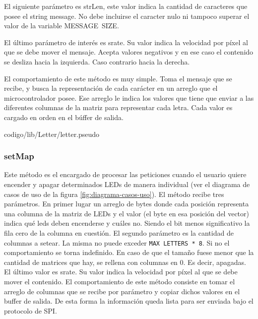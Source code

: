        El siguiente parámetro es strLen, este valor indica la cantidad de caracteres que posee el string message. No debe incluirse el caracter nulo ni tampoco superar el valor de la variable \mbox{MESSAGE SIZE}.

        El último parámetro de interés es srate. Su valor indica la velocidad por píxel al que se debe mover el mensaje. Acepta valores negativos y en ese caso el contenido se desliza hacia la izquierda. Caso contrario hacia la derecha.

        El comportamiento de este método es muy simple. Toma el mensaje que se recibe, y busca la representación de cada carácter en un arreglo que el microcontrolador posee. Ese arreglo le indica los valores que tiene que enviar a las diferentes columnas de la matriz para representar cada letra. Cada valor es cargado en orden en el búffer de salida.

        
                     {codigo/lib/Letter/letter.pseudo}

        \subsubsection{setMap}
        Este método es el encargado de procesar las peticiones cuando el usuario quiere encender y apagar determinados LEDs de manera individual (ver el diagrama de casos de uso de la figura \ref{fig:diagrama-casos-uso}). El método recibe tres parámetros. 
        En primer lugar un arreglo de bytes donde cada posición representa una columna de la matriz de LEDs y el valor (el byte en esa posición del vector) indica qué leds deben encenderse y cuáles no. Siendo el bit menos significativo la fila cero de la columna en cuestión.
        El segundo parámetro es la cantidad de columnas a setear. La misma no puede exceder \mbox{\texttt{MAX LETTERS * 8}}. Si no el comportamiento se torna indefinido. En caso de que el tamaño fuese menor que la cantidad de matrices que hay, se rellena con columnas en 0. Es decir, apagadas.
        El último valor es srate. Su valor indica la velocidad por píxel al que se debe mover el contenido.
        El comportamiento de este método consiste en tomar el arreglo de columnas que se recibe por parámetro y copiar dichos valores en el buffer de salida. De esta forma la información queda lista para ser enviada bajo el protocolo de SPI.
        
